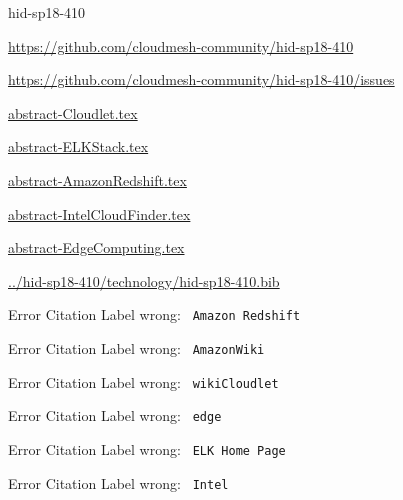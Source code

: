 \begin{IU}

hid-sp18-410

\url{https://github.com/cloudmesh-community/hid-sp18-410}

\url{https://github.com/cloudmesh-community/hid-sp18-410/issues}

\href{https://github.com/cloudmesh-community/hid-sp18-410/blob/master//technology/abstract-Cloudlet.tex}{abstract-Cloudlet.tex}

\href{https://github.com/cloudmesh-community/hid-sp18-410/blob/master//technology/abstract-ELKStack.tex}{abstract-ELKStack.tex}

\href{https://github.com/cloudmesh-community/hid-sp18-410/blob/master//technology/abstract-AmazonRedshift.tex}{abstract-AmazonRedshift.tex}

\href{https://github.com/cloudmesh-community/hid-sp18-410/blob/master//technology/abstract-IntelCloudFinder.tex}{abstract-IntelCloudFinder.tex}

\href{https://github.com/cloudmesh-community/hid-sp18-410/blob/master//technology/abstract-EdgeComputing.tex}{abstract-EdgeComputing.tex}

\href{https://github.com/cloudmesh-community/hid-sp18-410/blob/master//technology/hid-sp18-410.bib}{../hid-sp18-410/technology/hid-sp18-410.bib}

 Error Citation Label wrong: \verb| Amazon Redshift |

 Error Citation Label wrong: \verb| AmazonWiki |

 Error Citation Label wrong: \verb| wikiCloudlet |

 Error Citation Label wrong: \verb| edge |

 Error Citation Label wrong: \verb| ELK Home Page |

 Error Citation Label wrong: \verb| Intel |

\end{IU}


